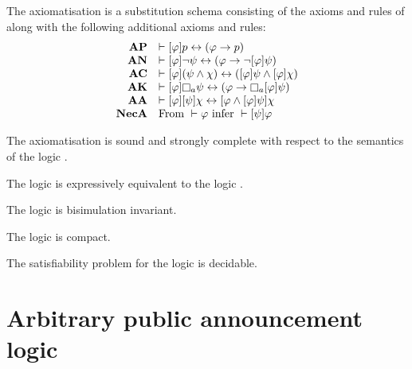 
\begin{definition}
The axiomatisation \axiomPalS{} is a substitution schema consisting of the axioms and rules of \axiomS{} along with the following additional axioms and rules:
$$
\begin{array}{rl}
    {\bf AP} & \proves \announceA{\phi} \atomP \iff (\phi \implies \atomP)\\
    {\bf AN} & \proves \announceA{\phi} \lnot \psi \iff (\phi \implies \lnot \announceA{\phi} \psi)\\
    {\bf AC} & \proves \announceA{\phi} (\psi \land \chi) \iff (\announceA{\phi} \psi \land \announceA{\phi} \chi)\\
    {\bf AK} & \proves \announceA{\phi} \necessaryA \psi \iff (\phi \implies \necessaryA \announceA{\phi} \psi)\\
    {\bf AA} & \proves \announceA{\phi} \announceA{\psi} \chi \iff \announceA{\phi \land \announceA{\phi} \psi} \chi\\
    {\bf NecA} & \text{From } \proves \phi \text{ infer } \proves \announceA{\psi} \phi
\end{array}
$$
\end{definition}

\begin{proposition}
The axiomatisation \axiomPalS{} is sound and strongly complete with respect to the semantics of the logic \logicPalS{}.
\end{proposition}

\begin{proposition}
The logic \logicPalS{} is expressively equivalent to the logic \logicS{}.
\end{proposition}

\begin{proposition}
The logic \logicPalS{} is bisimulation invariant.
\end{proposition}

\begin{proposition}
The logic \logicPalS{} is compact.
\end{proposition}

\begin{proposition}
The satisfiability problem for the logic \logicPalS{} is decidable.
\end{proposition}

\section{Arbitrary public announcement logic}\label{apal}

